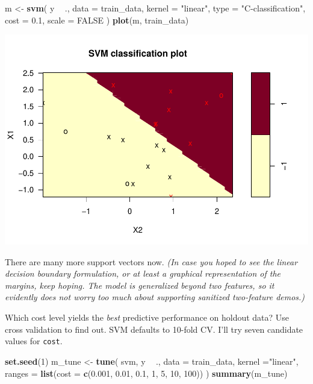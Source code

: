 \documentclass[
]{book}
\newenvironment{Shaded}{\begin{snugshade}}{\end{snugshade}}
\newcommand{\DataTypeTok}[1]{\textcolor[rgb]{0.13,0.29,0.53}{#1}}
\newcommand{\DecValTok}[1]{\textcolor[rgb]{0.00,0.00,0.81}{#1}}
\newcommand{\FloatTok}[1]{\textcolor[rgb]{0.00,0.00,0.81}{#1}}
\newcommand{\KeywordTok}[1]{\textcolor[rgb]{0.13,0.29,0.53}{\textbf{#1}}}
\newcommand{\NormalTok}[1]{#1}
\newcommand{\OperatorTok}[1]{\textcolor[rgb]{0.81,0.36,0.00}{\textbf{#1}}}
\newcommand{\OtherTok}[1]{\textcolor[rgb]{0.56,0.35,0.01}{#1}}
\newcommand{\StringTok}[1]{\textcolor[rgb]{0.31,0.60,0.02}{#1}}
\begin{document}
\begin{Shaded}
\begin{Highlighting}[]
\NormalTok{m <-}\StringTok{ }\KeywordTok{svm}\NormalTok{(}
\NormalTok{  y }\OperatorTok{~}\StringTok{ }\NormalTok{., }
  \DataTypeTok{data =}\NormalTok{ train_data,}
  \DataTypeTok{kernel =} \StringTok{"linear"}\NormalTok{,}
  \DataTypeTok{type =} \StringTok{"C-classification"}\NormalTok{,  }
  \DataTypeTok{cost =} \FloatTok{0.1}\NormalTok{,}
  \DataTypeTok{scale =} \OtherTok{FALSE}
\NormalTok{)}
\KeywordTok{plot}\NormalTok{(m, train_data)}
\end{Highlighting}
\end{Shaded}

\includegraphics{data-sci_files/figure-latex/unnamed-chunk-132-1.pdf}

There are many more support vectors now. \emph{(In case you hoped to see the linear decision boundary formulation, or at least a graphical representation of the margins, keep hoping. The model is generalized beyond two features, so it evidently does not worry too much about supporting sanitized two-feature demos.)}

Which cost level yields the \emph{best} predictive performance on holdout data? Use cross validation to find out. SVM defaults to 10-fold CV. I'll try seven candidate values for \texttt{cost}.

\begin{Shaded}
\begin{Highlighting}[]
\KeywordTok{set.seed}\NormalTok{(}\DecValTok{1}\NormalTok{)}
\NormalTok{m_tune <-}\StringTok{ }\KeywordTok{tune}\NormalTok{(}
\NormalTok{  svm,}
\NormalTok{  y }\OperatorTok{~}\StringTok{ }\NormalTok{.,}
  \DataTypeTok{data =}\NormalTok{ train_data,}
  \DataTypeTok{kernel =}\StringTok{"linear"}\NormalTok{,}
  \DataTypeTok{ranges =} \KeywordTok{list}\NormalTok{(}\DataTypeTok{cost =} \KeywordTok{c}\NormalTok{(}\FloatTok{0.001}\NormalTok{, }\FloatTok{0.01}\NormalTok{, }\FloatTok{0.1}\NormalTok{, }\DecValTok{1}\NormalTok{, }\DecValTok{5}\NormalTok{, }\DecValTok{10}\NormalTok{, }\DecValTok{100}\NormalTok{))}
\NormalTok{)}
\KeywordTok{summary}\NormalTok{(m_tune)}
\end{Highlighting}
\end{Shaded}
\end{document}
